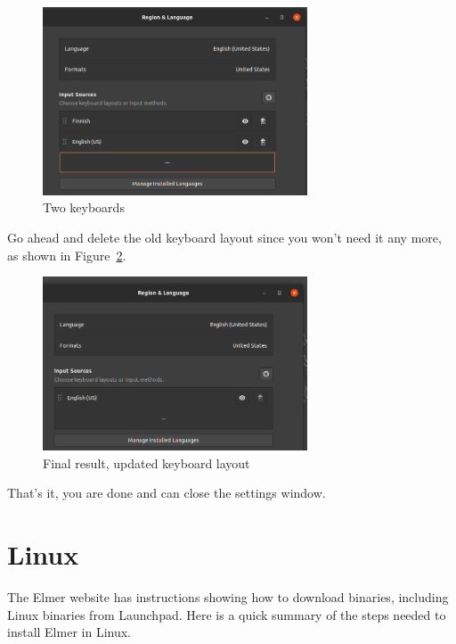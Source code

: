 \begin{figure}[H]
\begin{center}
\includegraphics[width=0.7\textwidth]{virt-12}
\caption{Two keyboards}\label{fg:virt-12}
\end{center}
\end{figure}

Go ahead and delete the old keyboard layout since you won't need it any more, as shown in Figure~\ref{fg:virt-13}.

\begin{figure}[H]
\begin{center}
\includegraphics[width=0.7\textwidth]{virt-13}
\caption{Final result, updated keyboard layout}\label{fg:virt-13}
\end{center}
\end{figure}

That's it, you are done and can close the settings window.

\chapter{Linux}

The Elmer website has instructions showing how to download binaries, including Linux binaries from Launchpad.  Here is a quick summary of the steps needed to install Elmer in Linux.\\

